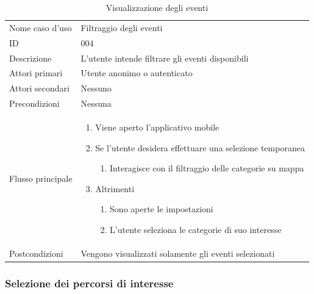 \documentclass{article}
\begin{document}
\begin{table}[htbp]
    \centering
    \begin{tabularx}{\textwidth}{| l | p{} |}
        \Xhline{2pt} %
        Nome caso d'uso & Filtraggio degli eventi \\
        \Xhline{2pt} %
        ID & 004 \\
        \hline
        Descrizione & L'utente intende filtrare gli eventi disponibili\\
        \hline
        Attori primari & Utente anonimo o autenticato\\
        \hline
        Attori secondari & Nessuno \\
        \hline
        Precondizioni & Nessuna \\
        \hline
        Flusso principale & 
        \begin{enumerate}[topsep=5pt,partopsep=0pt,parsep=0pt,itemsep=0pt,before=\vspace{-\baselineskip},after=\vspace{-\baselineskip}]                
            \item Viene aperto l'applicativo mobile
            \item Se l'utente desidera effettuare una selezione temporanea
            \begin{enumerate}[leftmargin=*, nosep]
                \item Interagisce con il filtraggio delle categorie su mappa
            \end{enumerate}
            \item Altrimenti
            \begin{enumerate}[leftmargin=*, nosep]
                \item Sono aperte le impostazioni
                \item L'utente seleziona le categorie di suo interesse
            \end{enumerate}
        \end{enumerate}
        \\
        \hline
        Postcondizioni & Vengono visualizzati solamente gli eventi selezionati \\
        \hline
    \end{tabularx}
    \caption{Visualizzazione degli eventi}
    \label{tab:tabella_use_case004}
\end{table}

\subsubsection{Selezione dei percorsi di interesse}
\end{document}
